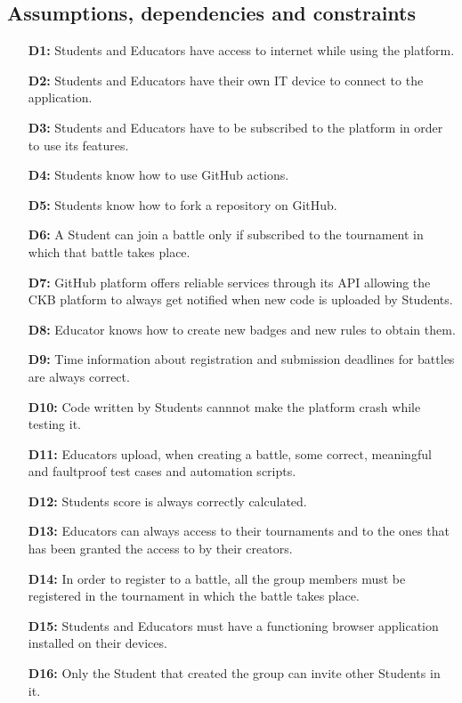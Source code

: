 \documentclass{article}
\begin{document}
{%
\newpage

\subsection{Assumptions, dependencies and constraints}
\begin{itemize}
    \item[\textbf{D1:}] Students and Educators have access to internet while using the platform.
    \item[\textbf{D2:}] Students and Educators have their own IT device to connect to the application.
    \item[\textbf{D3:}] Students and Educators have to be subscribed to the platform in order to use its features.
    \item[\textbf{D4:}] Students know how to use GitHub actions.
    \item[\textbf{D5:}] Students know how to fork a repository on GitHub.
    \item[\textbf{D6:}] A Student can join a battle only if subscribed to the tournament in which that battle takes place.
    \item[\textbf{D7:}] GitHub platform offers reliable services through its API allowing the CKB platform to always get notified when new code is uploaded by Students.
    \item[\textbf{D8:}] Educator knows how to create new badges and new rules to obtain them.
    \item[\textbf{D9:}] Time information about registration and submission deadlines for battles are always correct.
    \item[\textbf{D10:}] Code written by Students cannnot make the platform crash while testing it.
    \item[\textbf{D11:}] Educators upload, when creating a battle, some correct, meaningful and faultproof test cases and automation scripts.
    \item[\textbf{D12:}] Students score is always correctly calculated.
    \item[\textbf{D13:}] Educators can always access to their tournaments and to the ones that has been granted the access to
    by their creators.
    \item[\textbf{D14:}] In order to register to a battle, all the group members must be registered in the tournament
          in which the battle takes place.
    \item[\textbf{D15:}] Students and Educators must have a functioning browser application installed on their devices.
    \item[\textbf{D16:}] Only the Student that created the group can invite other Students in it.
\end{itemize}


}
\end{document}
